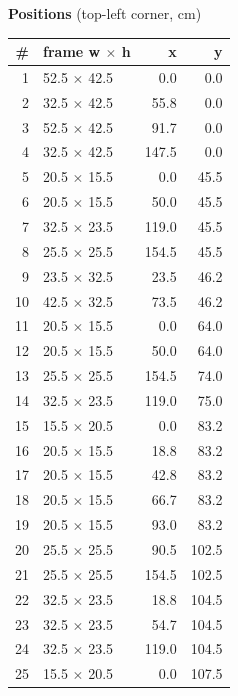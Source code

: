 \documentclass[a4paper,landscape,10pt]{article}
\begin{document}
\begin{minipage}[t]{0.25\textwidth}
\vspace{8pt}
{\bfseries Positions} (top-left corner, cm)\\[2pt]
\tiny
\begin{tabular}{@{}r l r r@{}}
\toprule
\# & frame w $\times$ h & x & y \\
\midrule
1 & 52.5 $\times$ 42.5 & 0.0 & 0.0 \\
2 & 32.5 $\times$ 42.5 & 55.8 & 0.0 \\
3 & 52.5 $\times$ 42.5 & 91.7 & 0.0 \\
4 & 32.5 $\times$ 42.5 & 147.5 & 0.0 \\
5 & 20.5 $\times$ 15.5 & 0.0 & 45.5 \\
6 & 20.5 $\times$ 15.5 & 50.0 & 45.5 \\
7 & 32.5 $\times$ 23.5 & 119.0 & 45.5 \\
8 & 25.5 $\times$ 25.5 & 154.5 & 45.5 \\
9 & 23.5 $\times$ 32.5 & 23.5 & 46.2 \\
10 & 42.5 $\times$ 32.5 & 73.5 & 46.2 \\
11 & 20.5 $\times$ 15.5 & 0.0 & 64.0 \\
12 & 20.5 $\times$ 15.5 & 50.0 & 64.0 \\
13 & 25.5 $\times$ 25.5 & 154.5 & 74.0 \\
14 & 32.5 $\times$ 23.5 & 119.0 & 75.0 \\
15 & 15.5 $\times$ 20.5 & 0.0 & 83.2 \\
16 & 20.5 $\times$ 15.5 & 18.8 & 83.2 \\
17 & 20.5 $\times$ 15.5 & 42.8 & 83.2 \\
18 & 20.5 $\times$ 15.5 & 66.7 & 83.2 \\
19 & 20.5 $\times$ 15.5 & 93.0 & 83.2 \\
20 & 25.5 $\times$ 25.5 & 90.5 & 102.5 \\
21 & 25.5 $\times$ 25.5 & 154.5 & 102.5 \\
22 & 32.5 $\times$ 23.5 & 18.8 & 104.5 \\
23 & 32.5 $\times$ 23.5 & 54.7 & 104.5 \\
24 & 32.5 $\times$ 23.5 & 119.0 & 104.5 \\
25 & 15.5 $\times$ 20.5 & 0.0 & 107.5 \\
\bottomrule
\end{tabular}
\end{minipage}
\clearpage
\end{document}
